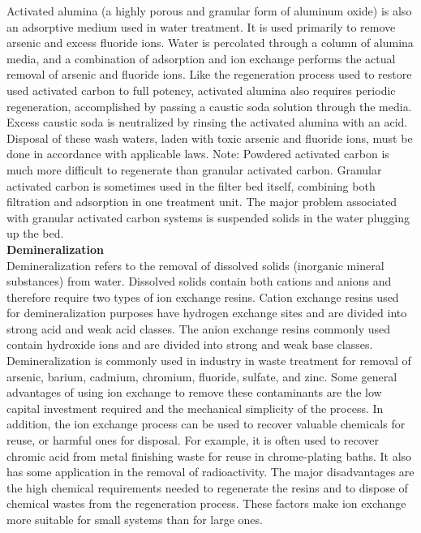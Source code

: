 Activated alumina (a highly porous and granular form of aluminum oxide) is also an adsorptive medium used in water treatment. It is used primarily to remove arsenic and excess fluoride ions. Water is percolated through a column of alumina media, and a combination of adsorption and ion exchange performs the actual removal of arsenic and fluoride ions. Like the regeneration process used to restore used activated carbon to full potency, activated alumina also requires periodic regeneration, accomplished by passing a caustic soda solution through the media. Excess caustic soda is neutralized by rinsing the activated alumina with an acid. Disposal of these wash waters, laden with toxic arsenic and fluoride ions, must be done in accordance with applicable laws.
Note: Powdered activated carbon is much more difficult to regenerate than granular activated carbon. Granular activated carbon is sometimes used in the filter bed itself, combining both filtration and adsorption in one treatment unit. The major problem associated with granular activated carbon systems is suspended solids in the water plugging up the bed.\\
 

\textbf{Demineralization}\\
Demineralization refers to the removal of dissolved solids (inorganic mineral substances) from water. Dissolved solids contain both cations and anions and therefore require two types of ion exchange resins. Cation exchange resins used for demineralization purposes have hydrogen exchange sites and are divided into strong acid and weak acid classes. The anion exchange resins commonly used contain hydroxide ions and are divided into strong and weak base classes. Demineralization is commonly used in industry in waste treatment for removal of arsenic, barium, cadmium, chromium, fluoride, sulfate, and zinc. Some general advantages of using ion exchange to remove these contaminants are the low capital investment required and the mechanical simplicity of the process. In addition, the ion exchange process can be used to recover valuable chemicals for reuse, or harmful ones for disposal. For example, it is often used to recover chromic acid from metal finishing waste for reuse in chrome-plating baths. It also has some application in the removal of radioactivity. The major disadvantages are the high chemical requirements needed to regenerate the resins and to dispose of chemical wastes from the regeneration process. These factors make ion exchange more suitable for small systems than for large ones.\\

